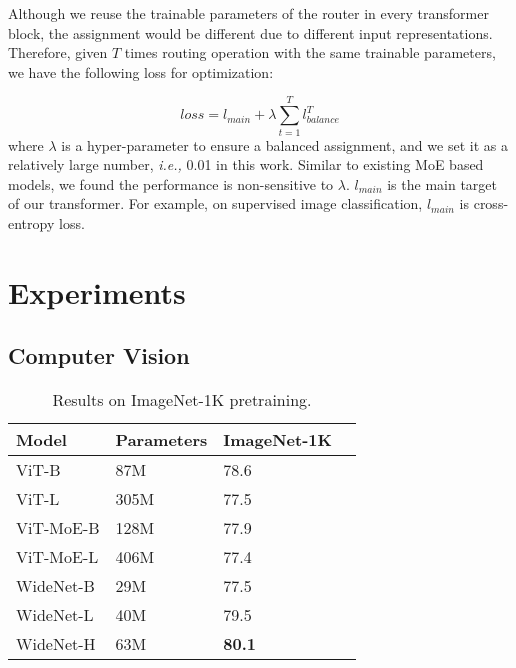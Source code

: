 \documentclass[letterpaper]{article} \usepackage{aaai22}  \usepackage{times}  \usepackage{helvet}  \usepackage{courier}  \usepackage[hyphens]{url}  \usepackage{graphicx} \urlstyle{rm} \def\UrlFont{\rm}  \usepackage{natbib}  \usepackage{caption} \DeclareCaptionStyle{ruled}{labelfont=normalfont,labelsep=colon,strut=off} \frenchspacing  \setlength{\pdfpagewidth}{8.5in}  \setlength{\pdfpageheight}{11in}  \usepackage{algorithm}
\newcommand{\ie}{\emph{i.e.,}\xspace}
\begin{document}
Although we reuse the trainable parameters of the router in every transformer block, the assignment would be different due to different input representations. Therefore, given $T$ times routing operation with the same trainable parameters, we have the following loss for optimization:

\begin{equation}
loss=l_{main} + \lambda \sum_{t=1}^T l_{balance}^T
\end{equation}
where $\lambda$ is a hyper-parameter to ensure a balanced assignment, and we set it as a relatively large number, \ie 0.01 in this work. Similar to existing MoE based models, we found the performance is non-sensitive to $\lambda$. $l_{main}$ is the main target of our transformer. For example, on supervised image classification, $l_{main}$ is cross-entropy loss.





\section{Experiments}
\label{sec:experiments}










\subsection{Computer Vision}
\label{sec:cv}




\begin{table}[t]
\centering
\caption{Results on ImageNet-1K pretraining.}
\label{tbl-main-pretraining-ImageNet}
\begin{tabular}{l|l l l}
\toprule
Model     & Parameters & ImageNet-1K  \\ \midrule
ViT-B               & 87M       & 78.6        \\
ViT-L              & 305M         & 77.5   \\ \midrule
ViT-MoE-B           & 128M          & 77.9   \\
ViT-MoE-L           & 406M        & 77.4   \\ \midrule
WideNet-B         & 29M        & 77.5       \\
WideNet-L          & 40M     & 79.5       \\
WideNet-H          & 63M      & \textbf{80.1}      \\
\bottomrule
\end{tabular}
\end{table}
\end{document}
